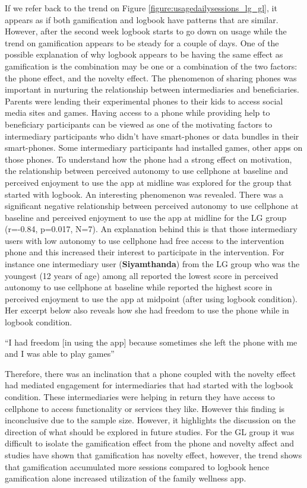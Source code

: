 If we refer back to the trend on Figure \ref{figure:usagedailysessions_lg_gl}, it appears as if both gamification and logbook have patterns that are similar. However, after the second week logbook starts to go down on usage while the trend on gamification appears to be steady for a couple of days. One of the possible explanation of why logbook appears to be having the same effect as gamification is the combination may be one or a combination of the two factors: the phone effect, and the novelty effect. The phenomenon of sharing phones was important in nurturing the relationship between intermediaries and beneficiaries. Parents were lending their experimental phones to their kids to access social media sites and games. Having access to a phone while providing help to beneficiary participants can be viewed as one of the motivating factors to intermediary participants who didn't have smart-phones or data bundles in their smart-phones. Some intermediary participants had installed games, other apps on those phones. To understand how the phone had a strong effect on motivation, the relationship between perceived autonomy to use cellphone at baseline and perceived enjoyment to use the app at midline was explored for the group that started with logbook. An interesting phenomenon was revealed. There was a significant negative relationship between perceived autonomy to use cellphone at baseline and perceived enjoyment to use the app at midline for the LG group (r=-0.84, p=0.017, N=7). An explanation behind this is that those intermediary users with low autonomy to use cellphone had free access to the intervention  phone and this increased their interest to participate in the intervention. For instance one intermediary user (\textbf{Siyamthanda}) from the LG group who was the youngest (12 years of age) among all reported the lowest score in perceived autonomy to use cellphone at baseline while reported the highest score in  perceived enjoyment to use the app at midpoint (after using logbook condition). Her excerpt below also reveals how she had freedom to use the phone while in logbook condition. 

 {``I had freedom [in using the app] because sometimes she left the phone with me and I was able to play games''}

Therefore, there was an inclination that a phone coupled with the novelty effect had mediated engagement for intermediaries that had started with the logbook condition. These intermediaries were helping in return they have access to cellphone to access functionality or services they like. However this finding is inconclusive due to the sample size. However, it highlights the discussion on the direction of what should be explored in future studies. For the GL group it was difficult to isolate the gamification effect from the phone and novelty affect and studies have shown that gamification has novelty effect, however, the trend shows that gamification accumulated more sessions compared to logbook hence gamification alone increased utilization of the family wellness app.

